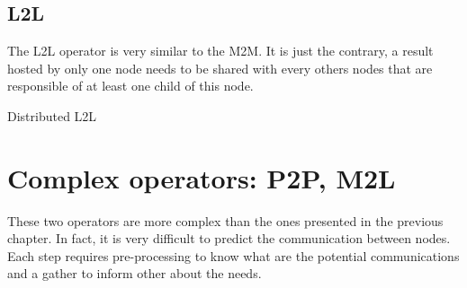 \documentclass[12pt,letterpaper,titlepage]{report}
\begin{document}
\section{L2L}
The L2L operator is very similar to the M2M.
It is just the contrary, a result hosted by only one node needs to be shared with every others nodes that are responsible of at least one child of this node.
\BlankLine
\begin{algorithm}[H]
\linesnumbered
\SetLine
{}
\BlankLine
{}
\BlankLine
\caption{Distributed L2L}
\end{algorithm}
\chapter{Complex operators: P2P, M2L}
These two operators are more complex than the ones presented in the previous chapter.
In fact, it is very difficult to predict the communication between nodes.
Each step requires pre-processing to know what are the potential communications and a gather to inform other about the needs.
\end{document}
